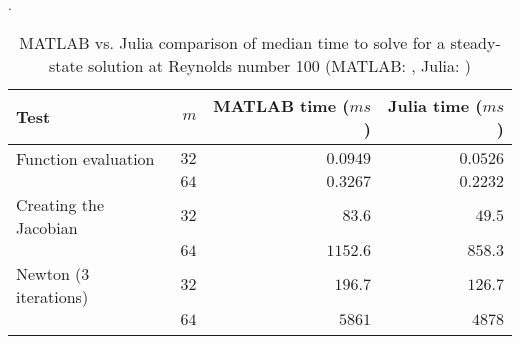 \begin{table}[ht]
  \caption{MATLAB vs. Julia comparison of median time to solve for a
    steady-state solution at Reynolds number 100 (MATLAB: , Julia:
    )}.
  \label{tab:matlab_julia}
\begin{tabular}{lrrr}
Test & $m$ & MATLAB time ($ms$) & Julia time ($ms$) \\
\hline
Function evaluation  & $32$ & $0.0949$  & $0.0526$ \\
& $64$ & $0.3267$ & $0.2232$ \\
 Creating the Jacobian  & $32$ & $83.6$  &  $49.5$  \\
& $64$ & $1152.6$ & $858.3$ \\
Newton (3 iterations)  & $32$ & $196.7$ & $126.7$ \\
& $64$ & $5861$  & $4878$ \\
\label{tab:comp}
\end{tabular}
\end{table}
